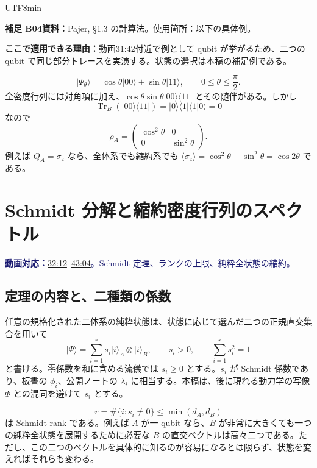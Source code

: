 \documentclass[11pt,a4paper]{article}
\numberwithin{equation}{section}
\newcommand{\Tr}{\operatorname{Tr}}
\newcommand{\ket}[1]{\lvert#1\rangle}
\newcommand{\bra}[1]{\langle#1\rvert}
\newcommand{\braket}[2]{\langle#1\vert#2\rangle}
\newcommand{\vid}[2]{\href{https://www.youtube.com/watch?v=3gDSaNy1O7Y\&t=#1s}{#2}}
\newcommand{\source}[1]{\par\noindent\textcolor{MidnightBlue}{\textbf{動画対応：}#1}\par}
\newcommand{\supp}[3]{\par\smallskip\noindent\textcolor{BrickRed}{\textbf{補足 #1}}\quad\textbf{資料：}#2\par\noindent\textbf{ここで適用できる理由：}#3\par}
\begin{document}
\begin{CJK*}{UTF8}{min}
\supp{B04}{Pajer\cite{pajer}, §1.3 の計算法。使用箇所：以下の具体例。}{動画31:42付近で例として qubit が挙がるため、二つの qubit で同じ部分トレースを実演する。状態の選択は本稿の補足例である。}
\begin{equation}
\ket{\Psi_\theta}=\cos\theta\ket{00}+\sin\theta\ket{11},
\qquad 0\leq\theta\leq\frac{\pi}{2}.
\label{eq:theta}
\end{equation}
全密度行列には対角項に加え、$\cos\theta\sin\theta\ket{00}\bra{11}$ とその随伴がある。しかし
\begin{equation}
\Tr_B(\ket{00}\bra{11})=\ket{0}\bra{1}\braket{1}{0}=0
\end{equation}
なので
\begin{equation}
\rho_A=\begin{pmatrix}\cos^2\theta&0\\0&\sin^2\theta\end{pmatrix}.
\label{eq:theta-reduced}
\end{equation}
例えば $Q_A=\sigma_z$ なら、全体系でも縮約系でも $\langle\sigma_z\rangle=\cos^2\theta-\sin^2\theta=\cos2\theta$ である。

\section{Schmidt 分解と縮約密度行列のスペクトル}
\label{sec:schmidt}
\source{\vid{1932}{32:12}--\vid{2584}{43:04}。Schmidt 定理、ランクの上限、純粋全状態の縮約。}
\subsection{定理の内容と、二種類の係数}
任意の規格化された二体系の純粋状態は、状態に応じて選んだ二つの正規直交集合を用いて
\begin{equation}
\ket{\Psi}=\sum_{i=1}^{r}s_i\ket{i}_A\otimes\ket{i}_B,
\qquad s_i>0,\qquad \sum_{i=1}^{r}s_i^2=1
\label{eq:schmidt}
\end{equation}
と書ける。零係数を和に含める流儀では $s_i\geq0$ とする。$s_i$ が Schmidt 係数であり、板書の $\phi_i$、公開ノートの $\lambda_i$ に相当する。本稿は、後に現れる動力学の写像 $\Phi$ との混同を避けて $s_i$ とする。

\begin{equation}
r=\#\{i:s_i\neq0\}\leq\min(d_A,d_B)
\label{eq:rankbound}
\end{equation}
は Schmidt rank である。例えば $A$ が一 qubit なら、$B$ が非常に大きくても一つの純粋全状態を展開するために必要な $B$ の直交ベクトルは高々二つである。ただし、この二つのベクトルを具体的に知るのが容易になるとは限らず、状態を変えればそれらも変わる。


\end{CJK*}
\end{document}
